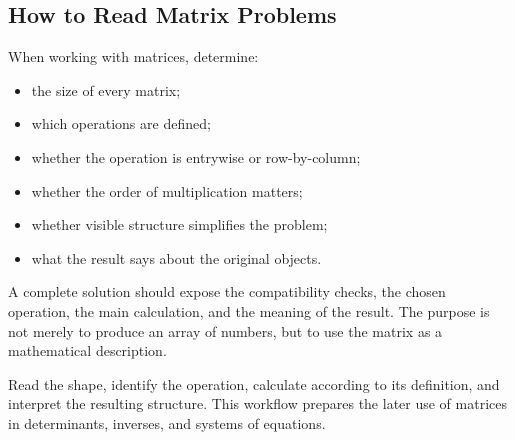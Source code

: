 \subsection{How to Read Matrix Problems}

\begin{corebox}
When working with matrices, determine:
\begin{itemize}
    \item the size of every matrix;
    \item which operations are defined;
    \item whether the operation is entrywise or row-by-column;
    \item whether the order of multiplication matters;
    \item whether visible structure simplifies the problem;
    \item what the result says about the original objects.
\end{itemize}
\end{corebox}

\begin{interpretationbox}
A complete solution should expose the compatibility checks, the chosen operation,
the main calculation, and the meaning of the result. The purpose is not merely to
produce an array of numbers, but to use the matrix as a mathematical description.
\end{interpretationbox}

\begin{summarybox}
Read the shape, identify the operation, calculate according to its definition,
and interpret the resulting structure. This workflow prepares the later use of
matrices in determinants, inverses, and systems of equations.
\end{summarybox}

